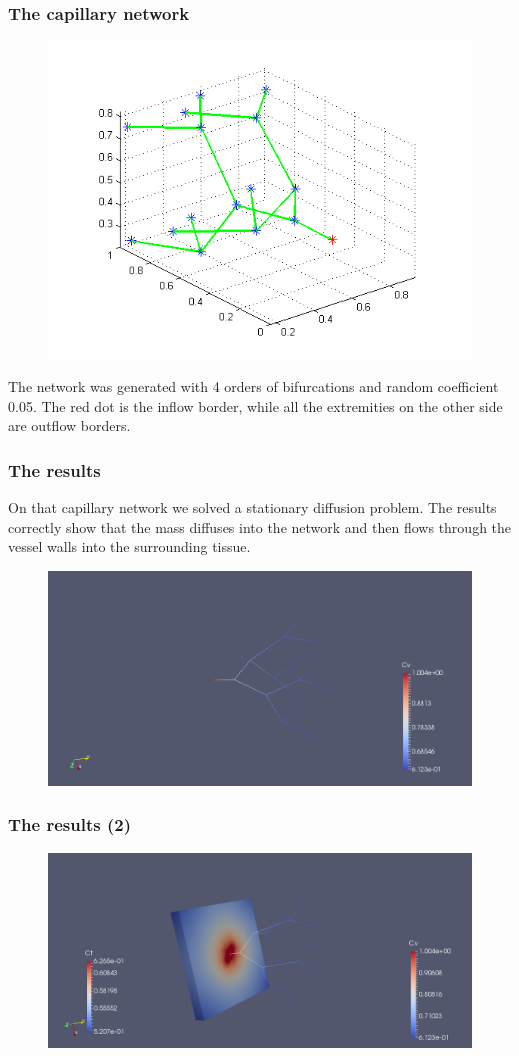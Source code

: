 \documentclass[11pt]{beamer}
\begin{document}
	\begin{frame}
		\frametitle{The capillary network}
		\begin{figure}
			\centering
			\includegraphics[width=.65\textwidth]{capillary_network}
		\end{figure}
		The network was generated with 4 orders of bifurcations and random coefficient 0.05. The red dot is the inflow border, while all the extremities on the other side are outflow borders.
	\end{frame}
	
	\begin{frame}
		\frametitle{The results}
		On that capillary network we solved a stationary diffusion problem. The results correctly show that the mass diffuses into the network and then flows through the vessel walls into the surrounding tissue.
		\begin{figure}[h]
			\centering
			\includegraphics[width=0.8\linewidth]{cv}
			\label{fig:cv}
		\end{figure}
	\end{frame}
	
	\begin{frame}
		\frametitle{The results (2)}
		\begin{figure}[!h]
			\centering
			\includegraphics[width=0.9\linewidth]{ct1}
			\label{fig:ct1}
		\end{figure}
	\end{frame}
	
\end{document}
